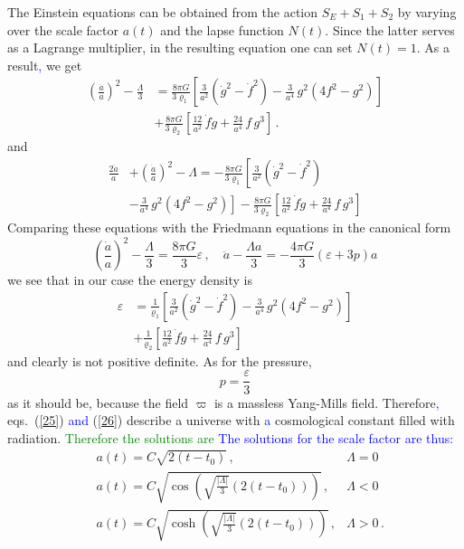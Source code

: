 \documentclass[prd,reprint,eqsecnum,nofootinbib]{revtex4-1}
\begin{document}
The Einstein equations can be obtained from the action $S_E
+S_1+S_2$ by varying over the scale factor $a(t)$ and the lapse
function $N(t)$. Since the latter serves as a Lagrange multiplier,
in the resulting equation one can set $N(t)=1$. As a result\textcolor{blue}{,} we get
\begin{align}
\left(\frac{\dot{a}}{a} \right)^2-\frac{\Lambda}{3}
 &=\frac{8\pi G}{3\varrho_1}\left[\frac{3}{a^2} \left(\dot g^2 - \dot
 f^2\right)
 -\frac{3}{a^4}\,g^2\left(4f^2-g^2\right)\right]\nonumber\\
 &+\frac{8\pi G}{3\varrho_2}\left[\frac{12}{a^2}\, \dot f \dot g +\frac{24}{a^4}\,f\, g^3\right]\,.\label{25}
\end{align}
and
\begin{align}
\frac{2\ddot a}{a} &+ \left(\frac{\dot a}{a}\right)^2 - \Lambda
 =-\frac{8\pi G}{3\varrho_1}\left[\frac{3}{a^2} \left(\dot g^2 - \dot
 f^2\right)\right.\nonumber\\
 &-\left.\frac{3}{a^4}\,g^2\left(4f^2-g^2\right)\right]
 -\frac{8\pi G}{3\varrho_2}\left[\frac{12}{a^2}\, \dot f \dot g +\frac{24}{a^4}\,f\, g^3\right]\label{26}
\end{align}
Comparing these equations with the Friedmann equations in the
canonical form
$$
\left(\frac{\dot{a}}{a} \right)^2-\frac\Lambda3=\frac{8\pi
G}{3}\varepsilon\, , \quad \ddot a -\frac{\Lambda a}3=-\frac{4\pi
G}{3}(\varepsilon+3p)a
$$
we see that in our case the energy density is
\begin{align}
    \varepsilon&= \frac{1}{\varrho_1}\left[\frac{3}{a^2} \left(\dot g^2 - \dot
 f^2\right)
 -\frac{3}{a^4}\,g^2\left(4f^2-g^2\right)\right]\nonumber\\
 &+\frac{1}{\varrho_2}\left[\frac{12}{a^2}\, \dot f \dot g +\frac{24}{a^4}\,f\, g^3\right]\label{27}
\end{align}
and clearly is not positive definite. As for the pressure,
\begin{equation}\label{28}
    p=\frac\varepsilon3
\end{equation}
as it should be, because the field $\varpi$ is a massless Yang-Mills
field. Therefore\textcolor{blue}{,} eqs.\ (\ref{25}) \textcolor{blue}{and} (\ref{26}) describe a universe
with \textcolor{blue}{a} cosmological constant filled with radiation. \textcolor{green}{Therefore the solutions are} \textcolor{blue}{The solutions for the scale factor are thus:}
\begin{align*}
 &a(t)= C \sqrt{2 (t-t_0)}\,, &\Lambda=0\\
 &a(t)= C \sqrt{\cos \left(\sqrt{\frac{|\Lambda|}{3} } \left(2 (t-t_0)\right)\right)}\,, &\Lambda<0\\
&a(t)= C \sqrt{\cosh \left(\sqrt{\frac{|\Lambda|}{3} } \left(2
(t-t_0)\right)\right)}\,, &\Lambda>0\,.
\end{align*}
\end{document}
